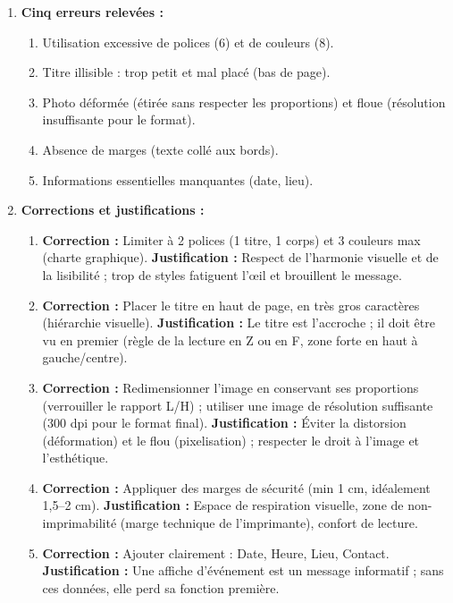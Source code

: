 \documentclass[11pt]{article}
\begin{document}
\begin{corrige}
\begin{enumerate}
\item \textbf{Cinq erreurs relevées :}
\begin{enumerate}
\item Utilisation excessive de polices (6) et de couleurs (8).
\item Titre illisible : trop petit et mal placé (bas de page).
\item Photo déformée (étirée sans respecter les proportions) et floue (résolution insuffisante pour le format).
\item Absence de marges (texte collé aux bords).
\item Informations essentielles manquantes (date, lieu).
\end{enumerate}
\item \textbf{Corrections et justifications :}
\begin{enumerate}
\item \textbf{Correction :} Limiter à 2 polices (1 titre, 1 corps) et 3 couleurs max (charte graphique). \textbf{Justification :} Respect de l'harmonie visuelle et de la lisibilité ; trop de styles fatiguent l'œil et brouillent le message.
\item \textbf{Correction :} Placer le titre en haut de page, en très gros caractères (hiérarchie visuelle). \textbf{Justification :} Le titre est l'accroche ; il doit être vu en premier (règle de la lecture en Z ou en F, zone forte en haut à gauche/centre).
\item \textbf{Correction :} Redimensionner l'image en conservant ses proportions (verrouiller le rapport L/H) ; utiliser une image de résolution suffisante (300 dpi pour le format final). \textbf{Justification :} Éviter la distorsion (déformation) et le flou (pixelisation) ; respecter le droit à l'image et l'esthétique.
\item \textbf{Correction :} Appliquer des marges de sécurité (min 1 cm, idéalement 1,5–2 cm). \textbf{Justification :} Espace de respiration visuelle, zone de non-imprimabilité (marge technique de l'imprimante), confort de lecture.
\item \textbf{Correction :} Ajouter clairement : Date, Heure, Lieu, Contact. \textbf{Justification :} Une affiche d'événement est un message informatif ; sans ces données, elle perd sa fonction première.
\end{enumerate}
\end{enumerate}
\end{corrige}
\end{document}
